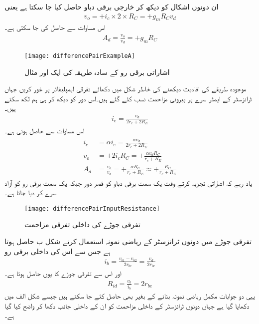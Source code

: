ان دونوں اشکال کو دیکھ کر خارجی برقی دباو حاصل کیا جا سکتا ہے یعنی
\begin{align}
v_o=+i_c \times 2 \times R_C=+g_m R_C v_d
\end{align}
اس مساوات سے    حاصل کی جا سکتی ہے۔
\begin{align}
A_d=\frac{v_o}{v_d}=+g_m R_C
\end{align}
%
\begin{figure}
\centering
\texttt{[image: differencePairExampleA]}
\caption{ اشاراتی برقی رو کے سادہ طریقہ کی ایک اور مثال}
\label{شکل_اشاراتی_برقی_رو_کے_سادہ_طریقے_کی_ایک_اور_مثال}
\end{figure}
موجودہ طریقے کی افادیت دیکھنے کی خاطر شکل   میں دکھائے تفرقی ایمپلیفائر پر غور کریں جہاں ٹرانزسٹر کے ایمٹر سرے پر بیرونی مزاحمت  نسب کئے گئے ہیں۔اس دور کو دیکھ کر ہی ہم لکھ سکتے ہیں۔
\begin{align*}
i_e=\frac{v_d}{2 r_e +2 R_E}
\end{align*}
اس مساوات سے  حاصل ہوتی ہے۔
\begin{gather}
\begin{aligned}
i_c&= \alpha i_e =\frac{\alpha v_d}{2 r_e + 2 R_E}\\
v_o&=+2 i_c R_C=+\frac{\alpha v_d R_C}{r_e+ R_E}\\
A_d&=\frac{v_o}{v_d}=+\frac{\alpha R_C}{r_e+R_E} \approx +\frac{R_C}{r_e+R_E}
\end{aligned}
\end{gather}
یاد رہے کہ اشاراتی تجزیہ کرتے وقت یک سمت برقی دباو کو قصر دور جبکہ یک سمت برقی رو کو آزاد  سرے کر دیا جاتا ہے۔ 



\begin{figure}
\centering
\texttt{[image: differencePairInputResistance]}
\caption{تفرقی جوڑے کی داخلی تفرقی مزاحمت}
\label{شکل_تفرقی_جوڑے_کی_داخلی_مزاحمت}
\end{figure}
تفرقی جوڑے میں دونوں ٹرانزسٹر کے   ریاضی نمونہ استعمال کرتے شکل  ب حاصل ہوتا ہے جس سے اس کی داخلی برقی رو  
\begin{align}
i_b=\frac{v_{b1}-v_{b2}}{2 r_{be}}=\frac{v_d}{2 r_{be}}
\end{align}
اور اس سے تفرقی جوڑے کا   یوں حاصل ہوتا ہے۔
\begin{align}
R_{id}=\frac{v_b}{i_b}=2 r_{be}
\end{align}
یہی دو جوابات مکمل ریاضی نمونہ بنانے کے بغیر بھی حاصل کئے جا سکتے ہیں جیسے شکل  الف میں دکھایا گیا ہے جہاں دونوں ٹرانزسٹر کے داخلی مزاحمت   کو  ان کے داخلی جانب دکھا کر واضح کیا گیا ہے۔

